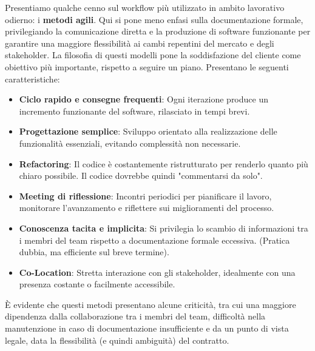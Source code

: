 \noindent Presentiamo qualche cenno sul workflow più utilizzato in ambito lavorativo odierno: i \textbf{metodi agili}. Qui si pone meno enfasi sulla
documentazione formale, privilegiando la comunicazione diretta e la produzione di software funzionante per garantire una maggiore flessibilità ai cambi
repentini del mercato e degli stakeholder. La filosofia di questi modelli pone la soddisfazione del cliente come obiettivo più importante, rispetto a
seguire un piano. Presentano le seguenti caratteristiche: \begin{itemize}
	\item \textbf{Ciclo rapido e consegne frequenti}: Ogni iterazione produce un incremento funzionante del software, rilasciato in tempi brevi.
	\item \textbf{Progettazione semplice}: Sviluppo orientato alla realizzazione delle funzionalità essenziali, evitando complessità non necessarie.
	\item \textbf{Refactoring}: Il codice è costantemente ristrutturato per renderlo quanto più chiaro possibile. Il codice dovrebbe quindi "commentarsi da solo".
	\item \textbf{Meeting di riflessione}: Incontri periodici per pianificare il lavoro, monitorare l'avanzamento e riflettere sui miglioramenti del processo.
	\item \textbf{Conoscenza tacita e implicita}: Si privilegia lo scambio di informazioni tra i membri del team rispetto a documentazione formale eccessiva. (Pratica dubbia, ma efficiente sul breve termine).
	\item \textbf{Co-Location}: Stretta interazione con gli stakeholder, idealmente con una presenza costante o facilmente accessibile.
\end{itemize}
\noindent È evidente che questi metodi presentano alcune criticità, tra cui una maggiore dipendenza dalla collaborazione tra i membri del team,
difficoltà nella manutenzione in caso di documentazione insufficiente e da un punto di vista legale, data la flessibilità (e quindi ambiguità) del
contratto.